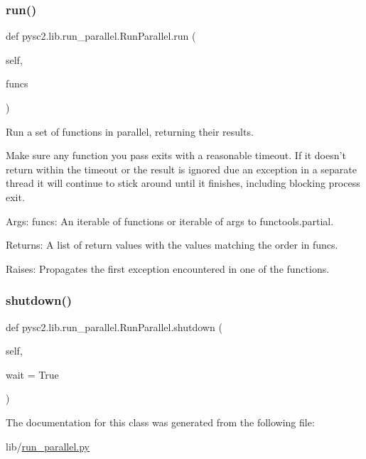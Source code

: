 \subsubsection{\texorpdfstring{run()}{run()}}
{\footnotesize\ttfamily def pysc2.\+lib.\+run\+\_\+parallel.\+Run\+Parallel.\+run (\begin{DoxyParamCaption}\item[{}]{self,  }\item[{}]{funcs }\end{DoxyParamCaption})}

\begin{DoxyVerb}Run a set of functions in parallel, returning their results.

Make sure any function you pass exits with a reasonable timeout. If it
doesn't return within the timeout or the result is ignored due an exception
in a separate thread it will continue to stick around until it finishes,
including blocking process exit.

Args:
  funcs: An iterable of functions or iterable of args to functools.partial.

Returns:
  A list of return values with the values matching the order in funcs.

Raises:
  Propagates the first exception encountered in one of the functions.
\end{DoxyVerb}
 \mbox{\label{classpysc2_1_1lib_1_1run__parallel_1_1_run_parallel_a3a4d5322d86770d3b32f58b76b544723}} 
\subsubsection{\texorpdfstring{shutdown()}{shutdown()}}
{\footnotesize\ttfamily def pysc2.\+lib.\+run\+\_\+parallel.\+Run\+Parallel.\+shutdown (\begin{DoxyParamCaption}\item[{}]{self,  }\item[{}]{wait = {\ttfamily True} }\end{DoxyParamCaption})}



The documentation for this class was generated from the following file\+:\begin{DoxyCompactItemize}
\item 
lib/\mbox{\hyperlink{run__parallel_8py}{run\+\_\+parallel.\+py}}\end{DoxyCompactItemize}
